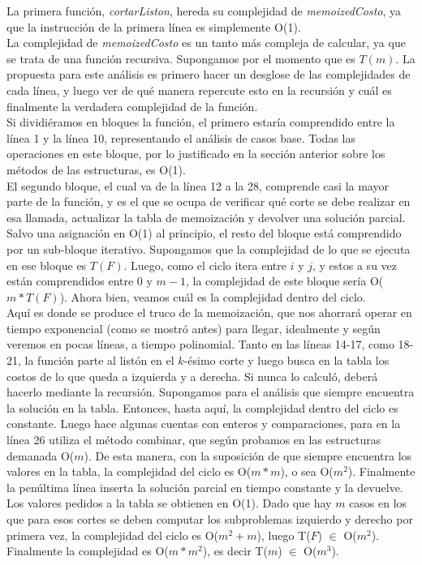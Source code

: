 \indent La primera función, \textsl{cortarListon}, hereda su complejidad de \textsl{memoizedCosto}, ya que la instrucción de la primera línea es simplemente O(1).\\
\indent La complejidad de \textsl{memoizedCosto} es un tanto más compleja de calcular, ya que se trata de una función recursiva. Supongamos por el momento que es $T(m)$. La propuesta para este análisis es primero hacer un desglose de las complejidades de cada línea, y luego ver de qué manera repercute esto en la recursión y cuál es finalmente la verdadera complejidad de la función.\\
\indent Si dividiéramos en bloques la función, el primero estaría comprendido entre la línea 1 y la línea 10, representando el análisis de casos base. Todas las operaciones en este bloque, por lo justificado en la sección anterior sobre los métodos de las estructuras, es O(1).\\
\indent El segundo bloque, el cual va de la línea 12 a la 28, comprende casi la mayor parte de la función, y es el que se ocupa de verificar qué corte se debe realizar en esa llamada, actualizar la tabla de memoización y devolver una solución parcial. Salvo una asignación en O(1) al principio, el resto del bloque está comprendido por un sub-bloque iterativo. Supongamos que la complejidad de lo que se ejecuta en ese bloque es $T(F)$. Luego, como el ciclo itera entre $i$ y $j$, y estos a su vez están comprendidos entre $0$ y $m-1$, la complejidad de este bloque sería O($m * T(F)$). Ahora bien, veamos cuál es la complejidad dentro del ciclo.\\
\indent Aquí es donde se produce el truco de la memoización, que nos ahorrará operar en tiempo exponencial (como se mostró antes) para llegar, idealmente y según veremos en pocas líneas, a tiempo polinomial. Tanto en las líneas 14-17, como 18-21, la función parte al listón en el $k$-ésimo corte y luego busca en la tabla los costos de lo que queda a izquierda y a derecha. Si nunca lo calculó, deberá hacerlo mediante la recursión. Supongamos para el análisis que siempre encuentra la solución en la tabla. Entonces, hasta aquí, la complejidad dentro del ciclo es constante. Luego hace algunas cuentas con enteros y comparaciones, para en la línea 26 utiliza el método combinar, que según probamos en las estructuras demanada O($m$). De esta manera, con la suposición de que siempre encuentra los valores en la tabla, la complejidad del ciclo es O($m * m$), o sea O($m^2$). Finalmente la penúltima línea inserta la solución parcial en tiempo constante y la devuelve.\\
\indent Los valores pedidos a la tabla se obtienen en O(1). Dado que hay $m$ casos en los que para esos cortes se deben computar los subproblemas izquierdo y derecho por primera vez, la complejidad del ciclo es O($m^2 + m$), luego T($F$) $\in$ O($m^2$). Finalmente la complejidad es O($m * m^2$), es decir T($m$) $\in$ O($m^3$).

